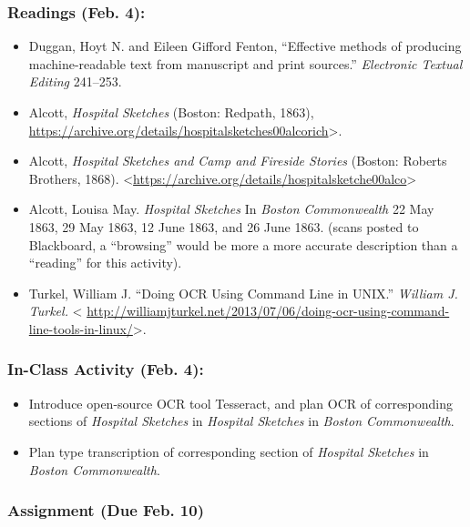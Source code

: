 \documentclass[]{article}
\begin{document}
\subsubsection{Readings (Feb. 4):}\label{readings-feb.-4}

\begin{itemize}
\itemsep1pt\parskip0pt
\item
  Duggan, Hoyt N. and Eileen Gifford Fenton, ``Effective methods of
  producing machine-readable text from manuscript and print sources.''
  \emph{Electronic Textual Editing} 241--253.
\item
  Alcott, \emph{Hospital Sketches} (Boston: Redpath, 1863),
  \url{https://archive.org/details/hospitalsketches00alcorich}\textgreater{}.
\item
  Alcott, \emph{Hospital Sketches and Camp and Fireside Stories}
  (Boston: Roberts Brothers, 1868).
  \textless{}\url{https://archive.org/details/hospitalsketche00alco}\textgreater{}
\item
  Alcott, Louisa May. \emph{Hospital Sketches} In \emph{Boston
  Commonwealth} 22 May 1863, 29 May 1863, 12 June 1863, and 26 June
  1863. (scans posted to Blackboard, a ``browsing'' would be more a more
  accurate description than a ``reading'' for this activity).
\item
  Turkel, William J. ``Doing OCR Using Command Line in UNIX.''
  \emph{William J. Turkel.} \textless{}
  \url{http://williamjturkel.net/2013/07/06/doing-ocr-using-command-line-tools-in-linux/}\textgreater{}.
\end{itemize}

\subsubsection{In-Class Activity (Feb.
4):}\label{in-class-activity-feb.-4}

\begin{itemize}
\itemsep1pt\parskip0pt
\item
  Introduce open-source OCR tool Tesseract, and plan OCR of
  corresponding sections of \emph{Hospital Sketches} in \emph{Hospital
  Sketches} in \emph{Boston Commonwealth}.
\item
  Plan type transcription of corresponding section of \emph{Hospital
  Sketches} in \emph{Boston Commonwealth}.
\end{itemize}

\subsubsection{Assignment (Due Feb. 10)}\label{assignment-due-feb.-10}
\end{document}
